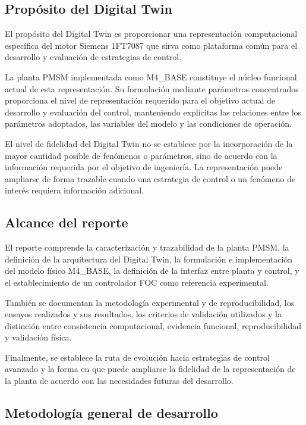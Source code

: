 \subsection{Propósito del Digital Twin}

El propósito del Digital Twin es proporcionar una representación computacional específica del motor Siemens 1FT7087 que sirva como plataforma común para el desarrollo y evaluación de estrategias de control.

La planta PMSM implementada como M4\_BASE constituye el núcleo funcional actual de esta representación. Su formulación mediante parámetros concentrados proporciona el nivel de representación requerido para el objetivo actual de desarrollo y evaluación del control, manteniendo explícitas las relaciones entre los parámetros adoptados, las variables del modelo y las condiciones de operación.

El nivel de fidelidad del Digital Twin no se establece por la incorporación de la mayor cantidad posible de fenómenos o parámetros, sino de acuerdo con la información requerida por el objetivo de ingeniería. La representación puede ampliarse de forma trazable cuando una estrategia de control o un fenómeno de interés requiera información adicional.

\subsection{Alcance del reporte}

El reporte comprende la caracterización y trazabilidad de la planta PMSM, la definición de la arquitectura del Digital Twin, la formulación e implementación del modelo físico M4\_BASE, la definición de la interfaz entre planta y control, y el establecimiento de un controlador FOC como referencia experimental.

También se documentan la metodología experimental y de reproducibilidad, los ensayos realizados y sus resultados, los criterios de validación utilizados y la distinción entre consistencia computacional, evidencia funcional, reproducibilidad y validación física.

Finalmente, se establece la ruta de evolución hacia estrategias de control avanzado y la forma en que puede ampliarse la fidelidad de la representación de la planta de acuerdo con las necesidades futuras del desarrollo.

\subsection{Metodología general de desarrollo}

